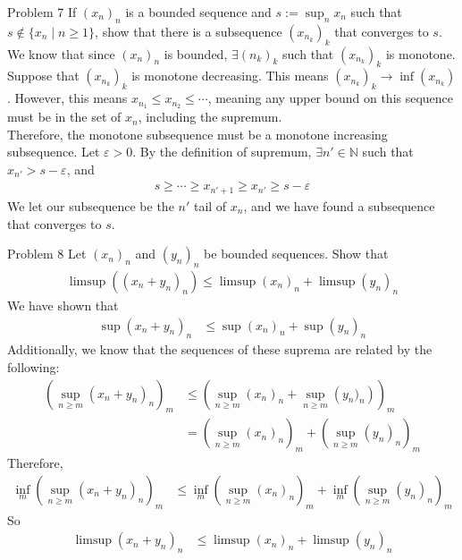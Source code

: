 \documentclass[10pt]{extarticle}
\newcommand{\N}{\mathbb{N}}
\begin{document}
  \begin{problem}{Problem 7}
    If $(x_n)_n$ is a bounded sequence and $s:= \sup_{n}{x_n}$ such that $s\notin \{x_n\mid n\geq 1\}$, show that there is a subsequence $\left(x_{n_k}\right)_k$ that converges to $s$.
    \tcblower
    We know that since $(x_n)_n$ is bounded, $\exists (n_k)_k$ such that $\left(x_{n_k}\right)_k$ is monotone.\\

    Suppose that $\left(x_{n_k}\right)_k$ is monotone decreasing. This means $\left(x_{n_k}\right)_k\rightarrow \inf\left(x_{n_k}\right)$. However, this means $x_{n_1} \leq x_{n_2}\leq \cdots$, meaning any upper bound on this sequence must be in the set of $x_n$, including the supremum.\\

    Therefore, the monotone subsequence must be a monotone increasing subsequence. Let $\varepsilon > 0$. By the definition of supremum, $\exists n'\in \N$ such that $x_{n'} > s - \varepsilon$, and 
    \begin{align*}
      s \geq \cdots \geq x_{n'+1} \geq x_{n'} \geq s - \varepsilon
    \end{align*}
    We let our subsequence be the $n'$ tail of $x_n$, and we have found a subsequence that converges to $s$.
  \end{problem}
  \begin{problem}{Problem 8}
    Let $(x_n)_n$ and $(y_n)_n$ be bounded sequences. Show that
    \begin{align*}
      \limsup \left(\left(x_n + y_n\right)_n\right) \leq \limsup\left(x_n\right)_n + \limsup\left(y_n\right)_n
    \end{align*}
    \tcblower
    We have shown that
    \begin{align*}
      \sup(x_n + y_n)_n &\leq \sup(x_n)_n + \sup(y_n)_n
    \end{align*}
    Additionally, we know that the sequences of these suprema are related by the following:
    \begin{align*}
      \left(\sup_{n\geq m}\left(x_n + y_n\right)_n\right)_m &\leq \left(\sup_{n\geq m}\left(x_n\right)_n + \sup_{n\geq m}\left(y_n)_n\right)\right)_m\\
                                                            &= \left(\sup_{n\geq m}\left(x_n\right)_n\right)_m + \left(\sup_{n\geq m}\left(y_n\right)_n\right)_m
    \end{align*}
    Therefore,
    \begin{align*}
      \inf_m\left(\sup_{n\geq m}\left(x_n + y_n\right)_n\right)_m &\leq \inf_m\left(\sup_{n\geq m}\left(x_n\right)_n\right)_m + \inf_m\left(\sup_{n\geq m}\left(y_n\right)_n\right)_m
    \end{align*}
    So
    \begin{align*}
      \limsup\left(x_n + y_n\right)_n &\leq \limsup\left(x_n\right)_n + \limsup\left(y_n\right)_n
    \end{align*}
  \end{problem}
\end{document}
